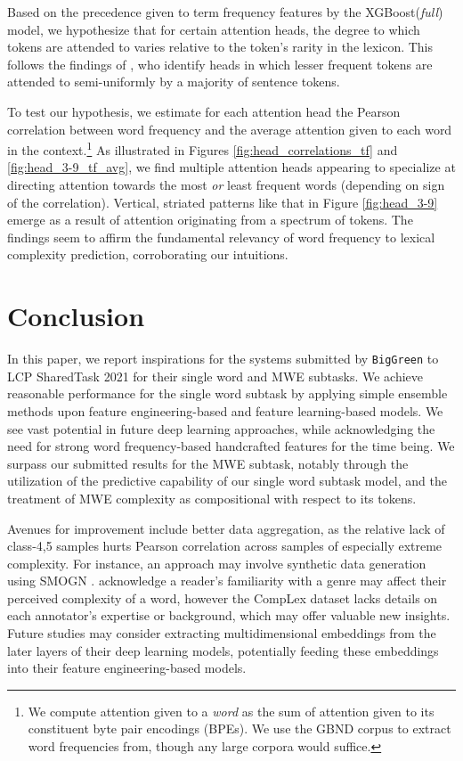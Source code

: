 \documentclass[11pt,a4paper]{article}
\begin{document}
Based on the precedence given to term frequency features by the XGBoost(\textit{full}) model, we hypothesize that for certain attention heads, the degree to which tokens are attended to varies relative to the token's rarity in the lexicon. This follows the findings of \citealp{1905-09418}, who identify heads in which lesser frequent tokens are attended to semi-uniformly by a majority of sentence tokens. 

To test our hypothesis, we estimate for each attention head the Pearson correlation between word frequency and the average attention given to each word in the context.\footnote{We compute attention given to a \textit{word} as the sum of attention given to its constituent byte pair encodings (BPEs). We use the GBND corpus to extract word frequencies from, though any large corpora would suffice.} As illustrated in Figures \ref{fig:head_correlations_tf} and \ref{fig:head_3-9_tf_avg}, we find multiple attention heads appearing to specialize at directing attention towards the most \textit{or} least frequent words (depending on sign of the correlation). Vertical, striated patterns like that in Figure \ref{fig:head_3-9} emerge as a result of attention originating from a spectrum of tokens. The findings seem to affirm the fundamental relevancy of word frequency to lexical complexity prediction, corroborating our intuitions.

\section{Conclusion}

In this paper, we report inspirations for the systems submitted by \texttt{BigGreen} to LCP SharedTask 2021 for their single word and MWE subtasks. We achieve  reasonable performance for the single word subtask by applying simple ensemble methods upon feature engineering-based and feature learning-based models. We see vast potential in future deep learning approaches, while acknowledging the need for strong word frequency-based handcrafted features for the time being. We surpass our submitted results for the MWE subtask, notably through the utilization of the predictive capability of our single word subtask model, and the treatment of MWE complexity as compositional with respect to its tokens.

Avenues for improvement include better data aggregation, as the relative lack of class-4,5 samples hurts Pearson correlation across samples of especially extreme complexity. For instance, an approach may involve synthetic data generation using SMOGN \citep{pmlr-v74-branco17a}. \citet{shardlow2020complex} acknowledge a reader's familiarity with a genre may affect their perceived complexity of a word, however the CompLex dataset lacks details on each annotator's expertise or background, which may offer valuable new insights. Future studies may consider extracting multidimensional embeddings from the later layers of their deep learning models, potentially feeding these embeddings into their feature engineering-based models.




\end{document}
